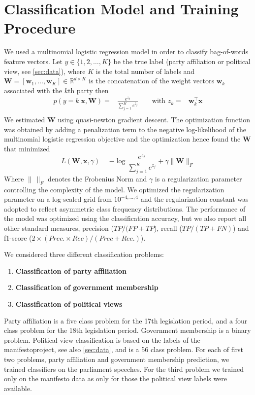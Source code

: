 \documentclass[runningheads,a4paper]{llncs}
\renewcommand{\vec}[1]{\mathbf{#1}}
\newcommand{\R}{\mathds{R}}
\begin{document}
\section{Classification Model and Training Procedure}\label{sec:model}
We used a multinomial logistic regression model in order to classify bag-of-words feature vectors. Let $y\in\{1,2,\dots,K\}$ be the true  label (party affiliation or political view, see \autoref{sec:data}), where $K$ is the total number of labels and $\vec{W}=[\vec{w}_1,\dots,\vec{w}_K]\in\R^{d\times K}$ is the concatenation of the weight vectors $\vec{w}_k$ associated with the $k$th party then 
\begin{eqnarray}\label{eq:logreg_multiclass}
p(y=k|\vec{x},\vec{W}) = &\frac{e^{z_k}}{\sum_{j=1}^K e^{z_j}} \qquad \textrm{with }  z_k=&\vec{w}_k^{\top}\vec{x} \\\nonumber
\end{eqnarray}
%
We estimated $\vec{W}$ using quasi-newton gradient descent. The optimization function was obtained by adding a penalization term to the negative log-likelihood of the multinomial logistic regression objective and the optimization hence found the $\vec{W}$ that minimized
\begin{equation}\label{eq:objective}
L(\vec{W}, \vec{x}, \gamma) = - \log{\frac{e^{z_k}}{\sum_{j=1}^K e^{z_j}}}+ \gamma \| \vec{W} \|_{F}
\end{equation}
Where $\|~\|_F$ denotes the Frobenius Norm and $\gamma$ is a regularization parameter controlling the complexity of the model. 
 We optimized the regularization parameter on a log-scaled grid from $10^{-4,\dots,4}$ and the regularization constant was adopted to reflect asymmetric class frequency distributions. The performance of the model was optimized using the classification accuracy, but we also report all other standard measures, precision ($TP / (FP + TP$), recall ($TP / (TP + FN)$) and f1-score ($2\times (Prec. \times Rec) / (Prec + Rec.)$). 

We considered three different classification problems: 
\begin{enumerate}
\item {\bf Classification of party affiliation} 
\item {\bf Classification of government membership}
\item {\bf Classification of political views}
\end{enumerate}

Party affiliation is a five class problem for the 17th legislation period, and a four class problem for the 18th legislation period. Government membership is a binary problem. Political view classification is based on the labels of the manifestoproject, see also \autoref{sec:data}, and is a 56 class problem. 
For each of first two problems, party affiliation and government membership prediction, we trained classifiers on the parliament speeches. For the third problem we trained only on the manifesto data as only for those the political view labels were available. 
\end{document}
